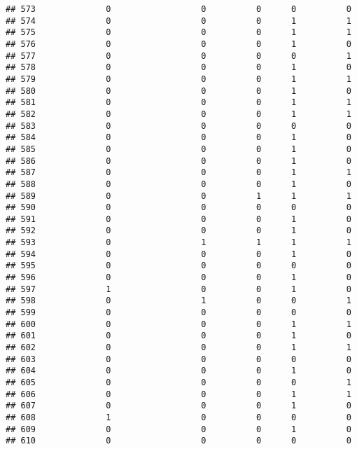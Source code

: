 \documentclass[
]{article}
\begin{document}
\begin{verbatim}
## 573              0                  0          0      0          0
## 574              0                  0          0      1          1
## 575              0                  0          0      1          1
## 576              0                  0          0      1          0
## 577              0                  0          0      0          1
## 578              0                  0          0      1          0
## 579              0                  0          0      1          1
## 580              0                  0          0      1          0
## 581              0                  0          0      1          1
## 582              0                  0          0      1          1
## 583              0                  0          0      0          0
## 584              0                  0          0      1          0
## 585              0                  0          0      1          0
## 586              0                  0          0      1          0
## 587              0                  0          0      1          1
## 588              0                  0          0      1          0
## 589              0                  0          1      1          1
## 590              0                  0          0      0          0
## 591              0                  0          0      1          0
## 592              0                  0          0      1          0
## 593              0                  1          1      1          1
## 594              0                  0          0      1          0
## 595              0                  0          0      0          0
## 596              0                  0          0      1          0
## 597              1                  0          0      1          0
## 598              0                  1          0      0          1
## 599              0                  0          0      0          0
## 600              0                  0          0      1          1
## 601              0                  0          0      1          0
## 602              0                  0          0      1          1
## 603              0                  0          0      0          0
## 604              0                  0          0      1          0
## 605              0                  0          0      0          1
## 606              0                  0          0      1          1
## 607              0                  0          0      1          0
## 608              1                  0          0      0          0
## 609              0                  0          0      1          0
## 610              0                  0          0      0          0

\end{verbatim}
\end{document}
